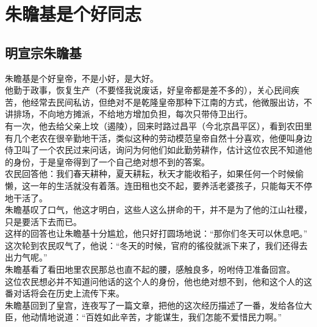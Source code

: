 \section{朱瞻基是个好同志}
\ifnum{}
	\begin{multicols}{\theparacolNo}
\fi
\subsection{明宣宗朱瞻基}
朱瞻基是个好皇帝，不是小好，是大好。\\

他勤于政事，恢复生产（不要怪我说废话，好皇帝都是差不多的），关心民间疾苦，他经常去民间私访，但绝对不是乾隆皇帝那种下江南的方式，他微服出访，不讲排场，不向地方摊派，不给地方增加负担，每次只带侍卫出行。\\

有一次，他去给父亲上坟（遏陵），回来时路过昌平（今北京昌平区），看到农田里有几个老农在很辛勤地干活，类似这种的劳动模范皇帝自然十分喜欢，他便叫身边侍卫叫了一个农民过来问话，询问为何他们如此勤劳耕作，估计这位农民不知道他的身份，于是皇帝得到了一个自己绝对想不到的答案。\\

农民回答他：我们春天耕种，夏天耕耘，秋天才能收稻子，如果任何一个时候偷懒，这一年的生活就没有着落。连田租也交不起，要养活老婆孩子，只能每天不停地干活了。\\

朱瞻基叹了口气，他这才明白，这些人这么拼命的干，并不是为了他的江山社稷，只是要活下去而已。\\

这样的回答也让朱瞻基十分尴尬，他只好打圆场地说：“那你们冬天可以休息吧。”\\

这次轮到农民叹气了，他说：“冬天的时候，官府的徭役就派下来了，我们还得去出力气呢。”\\

朱瞻基看了看田地里农民那总也直不起的腰，感触良多，吩咐侍卫准备回宫。\\

这位农民想必并不知道问他话的这个人的身份，他也绝对想不到，他和这个人的这番对话将会在历史上流传下来。\\

朱瞻基回到了皇宫，连夜写了一篇文章，把他的这次经历描述了一番，发给各位大臣，他动情地说道：“百姓如此辛苦，才能谋生，我们怎能不爱惜民力啊。”\\


\end{multicols}
